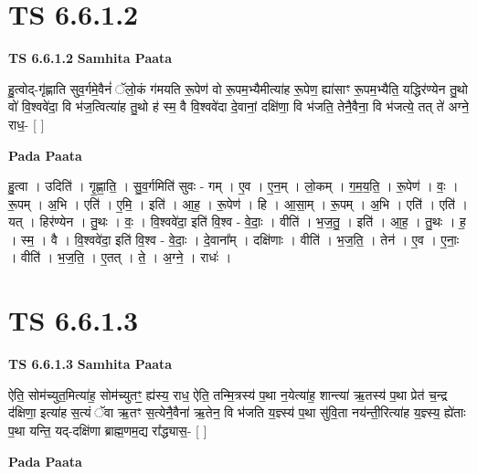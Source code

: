 \documentclass[17pt]{extarticle}
\begin{document}
\section*{ TS 6.6.1.2 }

\textbf{TS 6.6.1.2 } \newline
\textbf{Samhita Paata} \newline

हु॒त्वोद्-गृ॑ह्णाति सुव॒र्गमे॒वैनं॑ ॅलो॒कं ग॑मयति रू॒पेण॑ वो रू॒पम॒भ्यैमीत्या॑ह रू॒पेण॒ ह्या॑साꣳ रू॒पम॒भ्यैति॒ यद्धिर॑ण्येन तु॒थो वो॑ वि॒श्ववे॑दा॒ वि भ॑ज॒त्वित्या॑ह तु॒थो ह॑ स्म॒ वै वि॒श्ववे॑दा दे॒वानां॒ दक्षि॑णा॒ वि भ॑जति॒ तेनै॒वैना॒ वि भ॑जत्ये॒ तत् ते॑ अग्ने॒ राध॒- [  ] \newline

\textbf{Pada Paata} \newline

हु॒त्वा । उदिति॑ । गृ॒ह्णा॒ति॒ । सु॒व॒र्गमिति॑ सुवः - गम् । ए॒व । ए॒न॒म् । लो॒कम् । ग॒म॒य॒ति॒ । रू॒पेण॑ । वः॒ । रू॒पम् । अ॒भि । एति॑ । ए॒मि॒ । इति॑ । आ॒ह॒ । रू॒पेण॑ । हि । आ॒सा॒म् । रू॒पम् । अ॒भि । एति॑ । एति॑ । यत् । हिर॑ण्येन । तु॒थः । वः॒ । वि॒श्ववे॑दा॒ इति॑ वि॒श्व - वे॒दाः॒ । वीति॑ । भ॒ज॒तु॒ । इति॑ । आ॒ह॒ । तु॒थः । ह॒ । स्म॒ । वै । वि॒श्ववे॑दा॒ इति॑ वि॒श्व - वे॒दाः॒ । दे॒वाना᳚म् । दक्षि॑णाः । वीति॑ । भ॒ज॒ति॒ । तेन॑ । ए॒व । ए॒नाः॒ । वीति॑ । भ॒ज॒ति॒ । ए॒तत् । ते॒ । अ॒ग्ने॒ । राधः॑ ।  \newline




\section*{ TS 6.6.1.3 }

\textbf{TS 6.6.1.3 } \newline
\textbf{Samhita Paata} \newline

ऐति॒ सोम॑च्युत॒मित्या॑ह॒ सोम॑च्युतꣳ॒॒ ह्य॑स्य॒ राध॒ ऐति॒ तन्मि॒त्रस्य॑ प॒था न॒येत्या॑ह॒ शान्त्या॑ ऋ॒तस्य॑ प॒था प्रेत॑ च॒न्द्र द॑क्षिणा॒ इत्या॑ह स॒त्यं ॅवा ऋ॒तꣳ स॒त्येनै॒वैना॑ ऋ॒तेन॒ वि भ॑जति य॒ज्ञ्स्य॑ प॒था सु॑वि॒ता नय॑न्ती॒रित्या॑ह य॒ज्ञ्स्य॒ ह्ये॑ताः प॒था यन्ति॒ यद्-दक्षि॑णा ब्राह्म॒णम॒द्य रा᳚द्ध्यास॒- [  ] \newline

\textbf{Pada Paata} \newline
\end{document}
